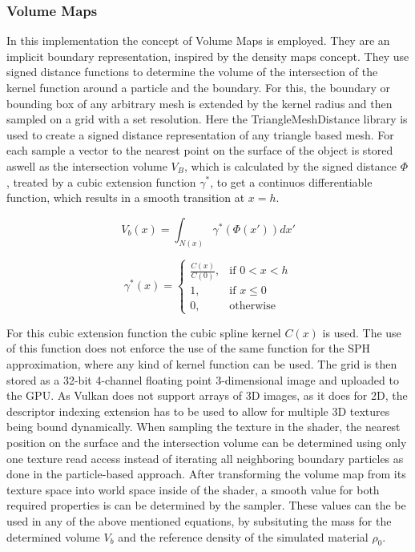 \documentclass[intern]{cgMA}
\begin{document}
    \subsubsection*{Volume Maps}
    In this implementation the concept of Volume Maps is employed. They are an implicit boundary representation, inspired by the density maps concept. They use signed distance functions to determine the volume of the intersection of the kernel function around a particle and the boundary. For this, the boundary or bounding box of any arbitrary mesh is extended by the kernel radius and then sampled on a grid with a set resolution. Here the TriangleMeshDistance library is used to create a signed distance representation of any triangle based mesh. For each sample a vector to the nearest point on the surface of the object is stored aswell as the intersection volume $V_B$, which is calculated by the signed distance $\Phi$, treated by a cubic extension function $\gamma^*$, to get a continuos differentiable function, which results in a smooth transition at $x = h$. \cite{10.1145/3359566.3360077}

    \begin{equation}
        V_b(x) = \int_{N(x)}\gamma^*(\Phi(x'))dx'
    \end{equation}

    \begin{equation}
        \gamma^*(x) = 
        \begin{cases}
            \frac{C(x)}{C(0)},& \text{if } 0 < x < h \\
            1,& \text{if } x \leq 0 \\
            0,              & \text{otherwise}
        \end{cases}
    \end{equation}

    For this cubic extension function the cubic spline kernel $C(x)$ \cite{doi:10.1146/annurev.aa.30.090192.002551} is used. The use of this function does not enforce the use of the same function for the SPH approximation, where any kind of kernel function can be used. \cite{10.1145/3359566.3360077}
    The grid is then stored as a 32-bit 4-channel floating point 3-dimensional image and uploaded to the GPU. As Vulkan does not support arrays of 3D images, as it does for 2D, the descriptor indexing extension has to be used to allow for multiple 3D textures being bound dynamically. When sampling the texture in the shader, the nearest position on the surface and the intersection volume can be determined using only one texture read access instead of iterating all neighboring boundary particles as done in the particle-based approach. After transforming the volume map from its texture space into world space inside of the shader, a smooth value for both required properties is can be determined by the sampler. These values can the be used in any of the above mentioned equations, by subsituting the mass for the determined volume $V_b$ and the reference density of the simulated material $\rho_0$.
\end{document}

